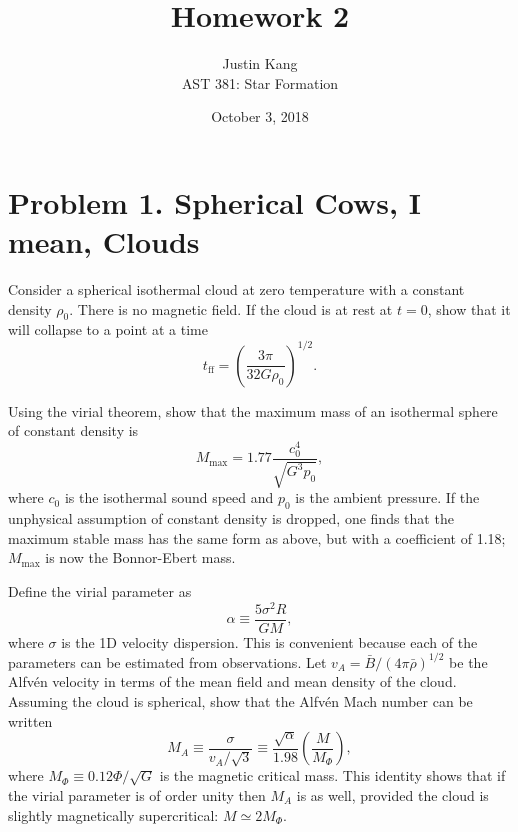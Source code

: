 \documentclass[11pt]{article}
\title{\vspace{-2em} \textbf{Homework 2}}
\author{Justin Kang \\ AST 381: Star Formation}
\date{\vspace{-0.75em} October 3, 2018}
\newenvironment{tight_enumerate}{
\begin{enumerate}[label=(\alph*)]
\setlength{\itemsep}{3pt}
\setlength{\parskip}{0pt}
}{\end{enumerate}}
\begin{document}
\maketitle
\singlespacing
{}
\sloppy


\vspace{-2em}
\section*{Problem 1. Spherical Cows, I mean, Clouds}
\begin{tight_enumerate}
\item Consider a spherical isothermal cloud at zero temperature with a constant density $\rho_{0}$. There is no magnetic field. If the cloud is at rest at $t = 0$, show that it will collapse to a point at a time 
\[t_{\text{ff}} = \left(\frac{3\pi}{32G\rho_{0}}\right)^{1/2}.\]
\item Using the virial theorem, show that the maximum mass of an isothermal sphere of constant density is
\[M_{\text{max}} = 1.77\frac{c_{0}^{4}}{\sqrt{G^{3}p_{0}}},\]
where $c_{0}$ is the isothermal sound speed and $p_{0}$ is the ambient pressure. If the unphysical assumption of constant density is dropped, one finds that the maximum stable mass has the same form as above, but with a coefficient of 1.18; $M_{\text{max}}$ is now the Bonnor-Ebert mass.
\item Define the virial parameter as 
\[\alpha \equiv \frac{5\sigma^{2}R}{GM},\]
where $\sigma$ is the 1D velocity dispersion. This is convenient because each of the parameters can be estimated from observations. Let $v_{A} = \bar{B}/(4\pi\bar{\rho})^{1/2}$ be the Alfv\'en velocity in terms of the mean field and mean density of the cloud. Assuming the cloud is spherical, show that the Alfv\'en Mach number can be written
\[M_{A} \equiv \frac{\sigma}{v_{A}/\sqrt{3}} \equiv \frac{\sqrt{\alpha}}{1.98}\left(\frac{M}{M_{\Phi}}\right),\]
where $M_{\Phi} \equiv 0.12\Phi/\sqrt{G}$ is the magnetic critical mass. This identity shows that if the virial parameter is of order unity then $M_{A}$ is as well, provided the cloud is slightly magnetically supercritical: $M \simeq 2M_{\Phi}$.
\end{tight_enumerate}
\end{document}

